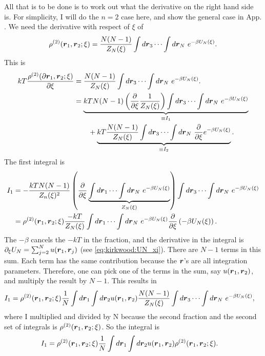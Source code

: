 All that is to be done is to work out what the derivative on the right hand side is.
For simplicity, I will do the $n=2$ case here, and show the general case in App. .
We need the derivative with respect of $\xi$ of
\begin{align}
\rho^{(2)}(\boldsymbol{r}_1,\boldsymbol{r}_2;\xi) =
\frac{N(N-1)}{Z_N(\xi)} \int d\boldsymbol{r}_3 \cdots \int d\boldsymbol{r}_N~
e^{-\beta U_N(\xi)}.
\end{align}
This is
\begin{align}\label{eq:kirkwood:first_deriv}
k T \frac{\rho^{(2)}(\partial \boldsymbol{r}_1,\boldsymbol{r}_2;\xi)}{\partial \xi} &=
\frac{N(N-1)}{Z_N(\xi)} \int d\boldsymbol{r}_3 \cdots \int d\boldsymbol{r}_N~
    e^{-\beta U_N(\xi)}. \\
&= 
    \underbrace{kT N (N-1) \left( \frac{\partial}{\partial \xi}
    \frac{1}{Z_N(\xi)} \right)
    \int d\boldsymbol{r}_3 \cdots \int d\boldsymbol{r}_N~ e^{-\beta U_N(\xi)}
    }_{ \equiv I_1}
    \nonumber \\
    &~~~~~~
    +\underbrace{ kT \frac{N(N-1)}{Z_N(\xi)}
    \int d\boldsymbol{r}_3 \cdots \int d\boldsymbol{r}_N~
    \frac{\partial}{\partial \xi}e^{-\beta U_N(\xi)}
    }_{\equiv I_2}.
\end{align}
The first integral is
\begin{align}
I_1 &= -\frac{kT N(N-1)}{Z_n(\xi)^2}
    \left( \frac{\partial}{\partial \xi}
        \underbrace{
        \int d\boldsymbol{r}_1 \cdots \int d\boldsymbol{r}_N~ e^{-\beta U_N(\xi)}
        }_{Z_N(\xi)}
    \right)
    \int d\boldsymbol{r}_3 \cdots \int d\boldsymbol{r}_N~ e^{-\beta U_N(\xi)} \\
&= \rho^{(2)}(\boldsymbol{r}_1,\boldsymbol{r}_2;\xi) \frac{-kT}{Z_N(\xi)}
    \int d\boldsymbol{r}_1 \cdots \int d\boldsymbol{r}_N~ e^{-\beta U_N(\xi)}
        \frac{\partial}{\partial \xi}
        \left( - \beta U_N(\xi) \right).
\end{align}
The $-\beta$ cancels the $-kT$ in the fraction, and the derivative in the integral is $\partial_\xi U_N = \sum_{j=2}^N u(\boldsymbol{r}_1,\boldsymbol{r}_j)$ (see \eqref{eq:kirkwood:UN_xi}).
There are $N-1$ terms in this sum.
Each term has the same contribution because the $\boldsymbol{r}$'s are all integration parameters.
Therefore, one can pick one of the terms in the sum, say $u(\boldsymbol{r}_1,\boldsymbol{r}_2)$, and multiply the result by $N-1$.
This results in
\begin{align}
I_1 &= \rho^{(2)}(\boldsymbol{r}_1,\boldsymbol{r}_2;\xi)\frac{1}{N}
    \int d\boldsymbol{r}_1 \int d\boldsymbol{r}_2 u(\boldsymbol{r}_1,\boldsymbol{r}_2)
    \frac{N(N-1)}{Z_N(\xi)}
    \int d\boldsymbol{r}_3 \cdots \int d\boldsymbol{r}_N~ e^{-\beta U_N(\xi)},
\end{align}
where I multiplied and divided by N because the second fraction and the second set of integrals is $\rho^{(2)}(\boldsymbol{r}_1,\boldsymbol{r}_2;\xi)$.
So the integral is
\begin{align}
I_1 &= \rho^{(2)}(\boldsymbol{r}_1,\boldsymbol{r}_2;\xi)\frac{1}{N}
    \int d\boldsymbol{r}_1 \int d\boldsymbol{r}_2 u(\boldsymbol{r}_1,\boldsymbol{r}_2)
    \rho^{(2)}(\boldsymbol{r}_1,\boldsymbol{r}_2;\xi).
\end{align}

